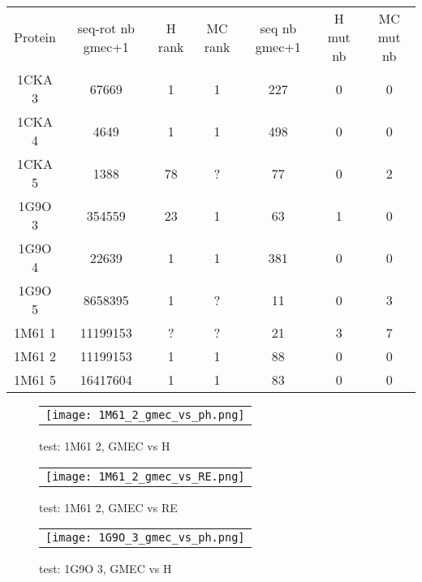     \begin{table}[h]
      \centering

      \begin{tabular}{ccccccc}


        \toprule
        Protein & seq-rot nb gmec+1 & H rank  & MC rank  & seq nb gmec+1 & H mut nb & MC mut nb \\
        \cmidrule{1-7}
        1CKA 3 & 67669 & 1 & 1 & 227 & 0 & 0 \\
        1CKA 4 & 4649 & 1 & 1 & 498 & 0 & 0 \\
        1CKA 5 & 1388 & 78 & ? & 77 & 0 & 2 \\
        1G9O 3 & 354559 & 23 & 1 & 63 & 1 & 0 \\
        1G9O 4 & 22639 & 1 & 1 & 381 & 0 & 0 \\
        1G9O 5 & 8658395 & 1 & ? &  11 & 0 & 3 \\
        1M61 1 & 11199153 & ? & ? & 21 & 3 & 7 \\
        1M61 2 & 11199153 & 1 & 1 & 88 & 0 & 0 \\
        1M61 5 & 16417604 & 1 & 1 & 83 & 0 & 0 \\
        \bottomrule
      \end{tabular} 
\label{tab:etude_au_voisinnage}           
\end{table}


    \clearpage
    
    \begin{figure}[h]
      \centering
      \begin{tabular}{c} 
        \texttt{[image: 1M61\_2\_gmec\_vs\_ph.png]} 
      \end{tabular}
      
      \caption{test: 1M61 2, GMEC vs H}
\label{image:1M61_2_GMEC_vs_H}
    \end{figure}
    
        
    \begin{figure}[h]
      \centering
      \begin{tabular}{c} 
        \texttt{[image: 1M61\_2\_gmec\_vs\_RE.png]} 
      \end{tabular}
      
      \caption{test: 1M61 2, GMEC vs RE}
\label{image:1M61_2_GMEC_vs_RE}
    \end{figure}
    
        
    \begin{figure}[h]
      \centering
      \begin{tabular}{c} 
        \texttt{[image: 1G9O\_3\_gmec\_vs\_ph.png]} 
      \end{tabular}
      
      \caption{test: 1G9O 3, GMEC vs H}
\label{image:1G9O_3_GMEC_vs_H}
    \end{figure}
    
